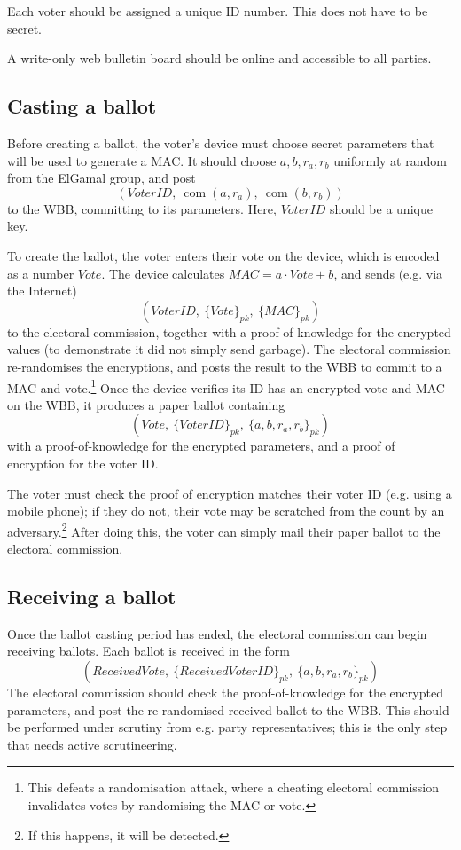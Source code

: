 \documentclass[11pt,twoside,a4paper]{article}
\DeclareMathOperator{\com}{com}
\theoremstyle{definition}
\begin{document}
Each voter should be assigned a unique ID number. This does not have to be secret.

A write-only web bulletin board should be online and accessible to all parties.
\subsection{Casting a ballot}
Before creating a ballot, the voter's device must choose secret parameters that will be used to generate a MAC. It should choose \(a,b,r_a,r_b\) uniformly at random from the ElGamal group, and post
\[(VoterID,\ \com(a,r_a),\ \com(b,r_b))\]
to the WBB, committing to its parameters. Here, \(VoterID\) should be a unique key.

To create the ballot, the voter enters their vote on the device, which is encoded as a number \(Vote\). The device calculates \(MAC=a\cdot Vote+b\), and sends (e.g. via the Internet)
\[(VoterID,\ \{Vote\}_{pk},\ \{MAC\}_{pk})\]
to the electoral commission, together with a proof-of-knowledge for the encrypted values (to demonstrate it did not simply send garbage). The electoral commission re-randomises the encryptions, and posts the result to the WBB to commit to a MAC and vote.\footnote{This defeats a randomisation attack, where a cheating electoral commission invalidates votes by randomising the MAC or vote.} Once the device verifies its ID has an encrypted vote and MAC on the WBB, it produces a paper ballot containing
\[(Vote,\ \{VoterID\}_{pk},\ \{a,b,r_a,r_b\}_{pk})\]
with a proof-of-knowledge for the encrypted parameters, and a proof of encryption for the voter ID.

The voter must check the proof of encryption matches their voter ID (e.g. using a mobile phone); if they do not, their vote may be scratched from the count by an adversary.\footnote{If this happens, it will be detected.} After doing this, the voter can simply mail their paper ballot to the electoral commission.
\subsection{Receiving a ballot}
Once the ballot casting period has ended, the electoral commission can begin receiving ballots. Each ballot is received in the form
\[(ReceivedVote,\ \{ReceivedVoterID\}_{pk},\ \{a,b,r_a,r_b\}_{pk})\]
The electoral commission should check the proof-of-knowledge for the encrypted parameters, and post the re-randomised received ballot to the WBB. This should be performed under scrutiny from e.g. party representatives; this is the only step that needs active scrutineering.
\end{document}
